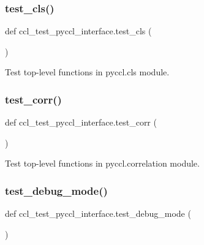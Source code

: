 \subsubsection{\texorpdfstring{test\+\_\+cls()}{test\_cls()}}
{\footnotesize\ttfamily def ccl\+\_\+test\+\_\+pyccl\+\_\+interface.\+test\+\_\+cls (\begin{DoxyParamCaption}{ }\end{DoxyParamCaption})}

\begin{DoxyVerb}Test top-level functions in pyccl.cls module.
\end{DoxyVerb}
 \mbox{\label{namespaceccl__test__pyccl__interface_ac7244d534c03943f2b622f66d8b5e431}} 
\subsubsection{\texorpdfstring{test\+\_\+corr()}{test\_corr()}}
{\footnotesize\ttfamily def ccl\+\_\+test\+\_\+pyccl\+\_\+interface.\+test\+\_\+corr (\begin{DoxyParamCaption}{ }\end{DoxyParamCaption})}

\begin{DoxyVerb}Test top-level functions in pyccl.correlation module.
\end{DoxyVerb}
 \mbox{\label{namespaceccl__test__pyccl__interface_aefa58335e41682f374a241db87d26278}} 
\subsubsection{\texorpdfstring{test\+\_\+debug\+\_\+mode()}{test\_debug\_mode()}}
{\footnotesize\ttfamily def ccl\+\_\+test\+\_\+pyccl\+\_\+interface.\+test\+\_\+debug\+\_\+mode (\begin{DoxyParamCaption}{ }\end{DoxyParamCaption})}

